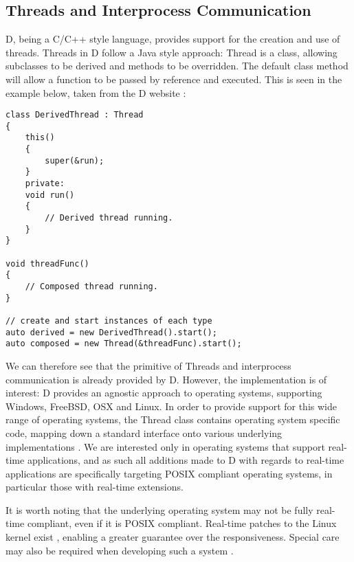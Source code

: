 \subsection{Threads and Interprocess Communication}
D, being a C/C++ style language, provides support for the creation and use of 
threads. Threads in D follow a Java style approach: Thread is a class, 
allowing subclasses to be derived and methods to be overridden. The default 
class method will allow a function to be passed by reference and executed. 
This is seen in the example below, taken from the D website
\cite{core-thread}: 
\begin{lstlisting}
class DerivedThread : Thread
{
    this()
    {
        super(&run);
    }
    private:
    void run()
    {
        // Derived thread running.
    }
}

void threadFunc()
{
    // Composed thread running.
}

// create and start instances of each type
auto derived = new DerivedThread().start();
auto composed = new Thread(&threadFunc).start();
\end{lstlisting}
We can therefore see that the primitive of Threads and interprocess communication 
is already provided by D. However, the implementation is of interest: D 
provides an agnostic approach to operating systems, supporting Windows, FreeBSD, 
OSX and Linux. 
In order to provide support for this wide range of operating systems, the Thread 
class contains operating system specific code, mapping down a standard interface 
onto various underlying implementations 
\cite{github-core-thread}. 
We are interested only in operating systems 
that support real-time applications, and as such all additions made to D with 
regards to real-time applications are specifically targeting POSIX compliant 
operating systems, in particular those with real-time extensions. 
\par\bigskip\noindent
It is worth noting that the underlying operating system may not be fully
real-time compliant, even if it is POSIX compliant. Real-time patches to the 
Linux kernel exist 
\cite{rt-wiki}, enabling a greater 
guarantee over the responsiveness. Special care may also be required when 
developing such a system 
\cite {rt-wiki-how-to}. 

